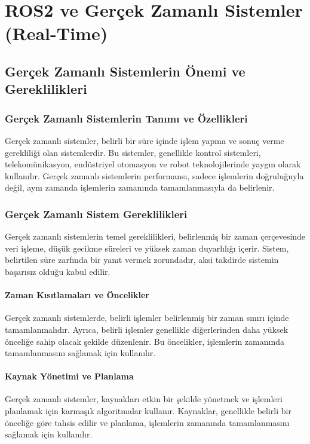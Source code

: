 \chapter{ROS2 ve Gerçek Zamanlı Sistemler (Real-Time)}

\section{Gerçek Zamanlı Sistemlerin Önemi ve Gereklilikleri}
\subsection{Gerçek Zamanlı Sistemlerin Tanımı ve Özellikleri}
Gerçek zamanlı sistemler, belirli bir süre içinde işlem yapma ve sonuç verme gerekliliği olan sistemlerdir. Bu sistemler, genellikle kontrol sistemleri, telekomünikasyon, endüstriyel otomasyon ve robot teknolojilerinde yaygın olarak kullanılır. Gerçek zamanlı sistemlerin performansı, sadece işlemlerin doğruluğuyla değil, aynı zamanda işlemlerin zamanında tamamlanmasıyla da belirlenir.

\subsection{Gerçek Zamanlı Sistem Gereklilikleri}
Gerçek zamanlı sistemlerin temel gereklilikleri, belirlenmiş bir zaman çerçevesinde veri işleme, düşük gecikme süreleri ve yüksek zaman duyarlılığı içerir. Sistem, belirtilen süre zarfında bir yanıt vermek zorundadır, aksi takdirde sistemin başarısız olduğu kabul edilir.

\subsubsection{Zaman Kısıtlamaları ve Öncelikler}
Gerçek zamanlı sistemlerde, belirli işlemler belirlenmiş bir zaman sınırı içinde tamamlanmalıdır. Ayrıca, belirli işlemler genellikle diğerlerinden daha yüksek önceliğe sahip olacak şekilde düzenlenir. Bu öncelikler, işlemlerin zamanında tamamlanmasını sağlamak için kullanılır.

\subsubsection{Kaynak Yönetimi ve Planlama}
Gerçek zamanlı sistemler, kaynakları etkin bir şekilde yönetmek ve işlemleri planlamak için karmaşık algoritmalar kullanır. Kaynaklar, genellikle belirli bir önceliğe göre tahsis edilir ve planlama, işlemlerin zamanında tamamlanmasını sağlamak için kullanılır.

